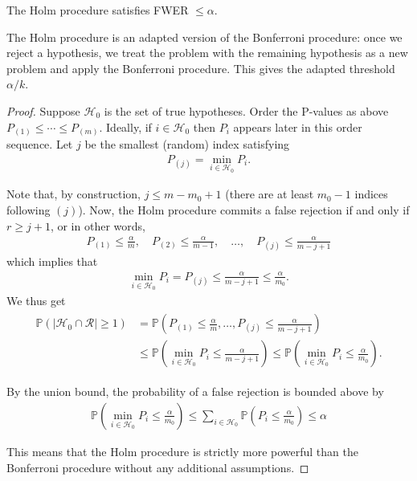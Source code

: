 \begin{thm}
    The Holm procedure satisfies FWER $\leq \alpha$.
\end{thm}


\begin{remark}
The Holm procedure is an adapted version of the Bonferroni procedure: once we reject a hypothesis, we treat the problem with the remaining hypothesis as a new problem and apply the Bonferroni procedure. This gives the adapted threshold $\alpha/k$.
\end{remark}

\begin{proof}
Suppose $\mathcal{H}_0$ is the set of true hypotheses. Order the P-values as above $P_{(1)} \leq \cdots \leq P_{(m)}$. Ideally, if $i \in \mathcal{H}_0$ then $P_i$ appears later in this order sequence. Let $j$ be the smallest (random) index satisfying
\begin{align*}
P_{(j)}=\min _{i \in \mathcal{H}_0} P_i .
\end{align*}

Note that, by construction, $j \leq m-m_0+1$ (there are at least $m_0-1$ indices following $(j)$). Now, the Holm procedure commits a false rejection if and only if $r \geq j+1$, or in other words,
\begin{align*}
P_{(1)} \leq \frac{\alpha}{m}, \quad P_{(2)} \leq \frac{\alpha}{m-1}, \quad \ldots, \quad P_{(j)} \leq \frac{\alpha}{m-j+1}
\end{align*}
which implies that
\begin{align*}
\min _{i \in \mathcal{H}_0} P_i=P_{(j)} \leq \frac{\alpha}{m-j+1} \leq \frac{\alpha}{m_0} .
\end{align*}
We thus get
\begin{align*}
\begin{aligned}
\mathbb{P}\left(\left|\mathcal{H}_0 \cap \mathcal{R}\right| \geq 1\right) & =\mathbb{P}\left(P_{(1)} \leq \frac{\alpha}{m}, \ldots, P_{(j)} \leq \frac{\alpha}{m-j+1}\right) \\
& \leq \mathbb{P}\left(\min _{i \in \mathcal{H}_0} P_i \leq \frac{\alpha}{m-j+1}\right) \leq \mathbb{P}\left(\min _{i \in \mathcal{H}_0} P_i \leq \frac{\alpha}{m_0}\right) .
\end{aligned}
\end{align*}


By the union bound, the probability of a false rejection is bounded above by
\begin{align*}
\mathbb{P}\left(\min _{i \in \mathcal{H}_0} P_i \leq \frac{\alpha}{m_0}\right) \leq \sum_{i \in \mathcal{H}_0} \mathbb{P}\left(P_i \leq \frac{\alpha}{m_0}\right) \leq \alpha
\end{align*}


This means that the Holm procedure is strictly more powerful than the Bonferroni procedure without any additional assumptions. 
\end{proof}

